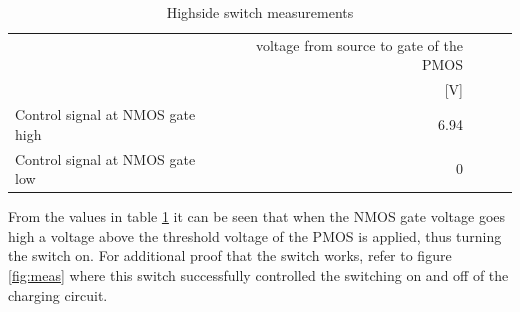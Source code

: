 \begin{table}[!htb]
        \centering
        \footnotesize
        \caption{Highside switch measurements}
         \begin{tabular}{lrrrr}
          \toprule
             & voltage from source to gate of the PMOS \\
             &  [V] \\
          \midrule
          Control signal at NMOS gate high &     6.94\\
          Control signal at NMOS gate low  &   0\\
         

          \bottomrule
        \end{tabular}
     \label{tab:PMOSmeas}
\end{table}
From the values in table \ref{tab:PMOSmeas} it can be seen that when the NMOS gate voltage goes high a voltage above the threshold voltage of the PMOS is applied, thus turning the switch on. For additional proof that the switch works, refer to figure \ref{fig:meas} where this switch successfully controlled the switching on and off of the charging circuit.
\newpage
